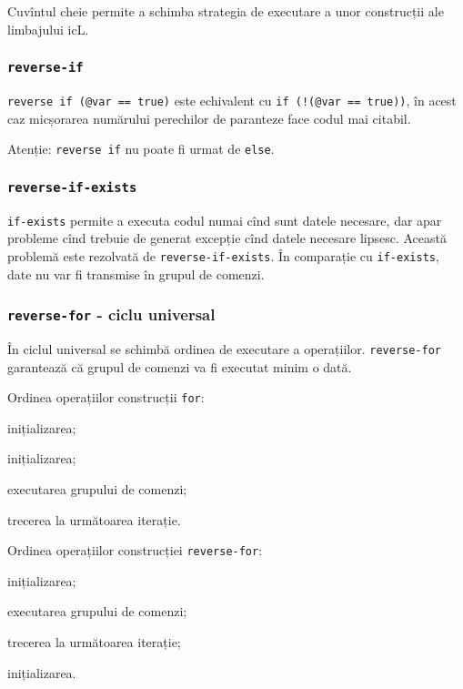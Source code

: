 Cuvîntul cheie  permite a schimba strategia de executare a unor construcții ale limbajului icL.

\subsubsection{\lstinline|reverse-if|}

\lstinline|reverse if (@var == true)| este echivalent cu \lstinline|if (!(@var == true))|, în acest caz micșorarea numărului perechilor de paranteze face codul mai citabil.

Atenție: \lstinline|reverse if| nu poate fi urmat de \lstinline|else|.

\subsubsection{\lstinline|reverse-if-exists|}

\lstinline|if-exists| permite a executa codul numai cînd sunt datele necesare, dar apar probleme cînd trebuie de generat excepție cînd datele necesare lipsesc. Această problemă este rezolvată de \lstinline|reverse-if-exists|. În comparație cu \lstinline|if-exists|, date nu var fi transmise în grupul de comenzi.

\subsubsection{\lstinline|reverse-for| - ciclu universal}

În ciclul universal se schimbă ordinea de executare a operațiilor. \lstinline|reverse-for| garantează că grupul de comenzi va fi executat minim o dată.

Ordinea operațiilor construcții \lstinline|for|:
\begin{icEnum}
	\item inițializarea;
	\item inițializarea;
	\item executarea grupului de comenzi;
	\item trecerea la următoarea iterație.
\end{icEnum}

Ordinea operațiilor construcției \lstinline|reverse-for|:
\begin{icEnum}
	\item inițializarea;
	\item executarea grupului de comenzi;
	\item trecerea la următoarea iterație;
	\item inițializarea.
\end{icEnum}

